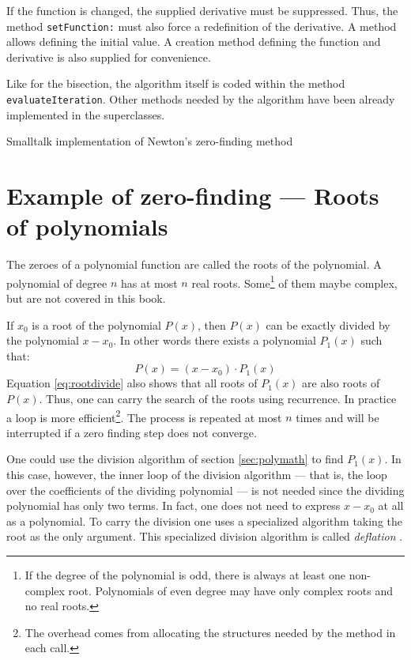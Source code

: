 \documentclass[twoside]{book}
\begin{document}
If the function is changed, the supplied derivative must be
suppressed. Thus, the method {\tt setFunction:} must also force a
redefinition of the derivative. A method allows defining the
initial value. A creation method defining the function and
derivative is also supplied for convenience.

Like for the bisection, the algorithm itself is coded within the
method {\tt evaluateIteration}. Other methods needed by the
algorithm have been already implemented in the superclasses.
\begin{listing} Smalltalk implementation of Newton's zero-finding method \label{ls:newtonZero}

\end{listing}




\section{Example of zero-finding --- Roots of polynomials}
\label{sec:polroots} The zeroes of a polynomial function are
called the roots of the polynomial. A polynomial of degree $n$ has
at most $n$ real roots. Some\footnote{If the degree of the
polynomial is odd, there is always at least one non-complex root.
Polynomials of even degree may have only complex roots and no real
roots.} of them maybe complex, but are not covered in this book.

If $x_0$ is a root of the polynomial $P\left(x\right)$, then
$P\left(x\right)$ can be exactly divided by the polynomial
$x-x_0$. In other words there exists a polynomial
$P_1\left(x\right)$ such that:
\begin{equation}
\label{eq:rootdivide}
  P\left(x\right) = \left(x-x_0\right)\cdot P_1\left(x\right)
\end{equation}
Equation \ref{eq:rootdivide} also shows that all roots of
$P_1\left(x\right)$ are also roots of $P\left(x\right)$. Thus, one
can carry the search of the roots using recurrence. In practice a
loop is more efficient\footnote{The overhead comes from allocating
the structures needed by the method in each call.}. The process is
repeated at most $n$ times and will be interrupted if a zero
finding step does not converge.

One could use the division algorithm of section \ref{sec:polymath}
to find $P_1\left(x\right)$. In this case, however, the inner loop
of the division algorithm --- that is, the loop over the
coefficients of the dividing polynomial --- is not needed since
the dividing polynomial has only two terms. In fact, one does not
need to express $x-x_0$ at all as a polynomial. To carry the
division one uses a specialized algorithm taking the root as the
only argument. This specialized division algorithm is called {\sl
deflation} \cite{Press}.
\end{document}
